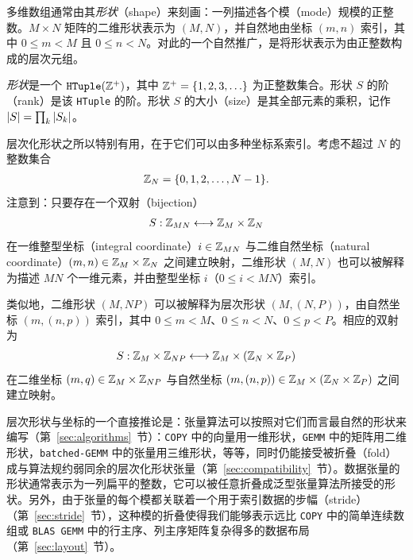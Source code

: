 \label{sec:shape}

多维数组通常由其\emph{形状}（shape）来刻画：一列描述各个模（mode）规模的正整数。$M{\times}N$ 矩阵的二维形状表示为 $(M,N)$，并自然地由坐标 $(m,n)$ 索引，其中 $0 \leq m < M$ 且 $0 \leq n < N$。对此的一个自然推广，是将形状表示为由正整数构成的层次元组。

\begin{definition}
\emph{形状}是一个 $\texttt{HTuple}(\mathbb{Z}^+)$，其中 $\mathbb{Z}^+ = \{1,2,3,\ldots\}$ 为正整数集合。形状 $S$ 的阶（rank）是该 \texttt{HTuple} 的阶。形状 $S$ 的大小（size）是其全部元素的乘积，记作 $\left| {S} \right| = \prod_k \left| {S_k} \right|$。
\end{definition}

层次化形状之所以特别有用，在于它们可以由多种坐标系索引。考虑不超过 $N$ 的整数集合
\begin{align*}
\mathbb{Z}_N = \{ 0, 1, 2, \ldots, N-1 \}.
\end{align*}
\CuTe 注意到：只要存在一个双射（bijection）
\begin{align*}
S : \mathbb{Z}_{MN} \longleftrightarrow \mathbb{Z}_M \times \mathbb{Z}_N
\end{align*}
在一维整型坐标（integral coordinate）$i \in \mathbb{Z}_{MN}$ 与二维自然坐标（natural coordinate）$(m,n) \in \mathbb{Z}_M \times \mathbb{Z}_N$ 之间建立映射，二维形状 $(M,N)$ 也可以被解释为描述 $MN$ 个一维元素，并由整型坐标 $i$（$0 \leq i < MN$）索引。

类似地，二维形状 $(M,NP)$ 可以被解释为层次形状 $(M,(N,P))$，由自然坐标 $(m,(n,p))$ 索引，其中 $0 \leq m < M$、$0 \leq n < N$、$0 \leq p < P$。相应的双射为
\begin{align*}
S : \mathbb{Z}_M \times \mathbb{Z}_{NP} \longleftrightarrow \mathbb{Z}_M \times (\mathbb{Z}_N \times \mathbb{Z}_P)
\end{align*}
在二维坐标 $(m,q) \in \mathbb{Z}_M \times \mathbb{Z}_{NP}$ 与自然坐标 $(m,(n,p)) \in \mathbb{Z}_M \times (\mathbb{Z}_N \times \mathbb{Z}_P)$ 之间建立映射。

层次形状与坐标的一个直接推论是：张量算法可以按照对它们而言最自然的形状来编写（第~\ref{sec:algorithms}~节）：{\tt COPY} 中的向量用一维形状，{\tt GEMM} 中的矩阵用二维形状，{\tt batched-GEMM} 中的张量用三维形状，等等，同时仍能接受被折叠（fold）成与算法规约弱同余的层次化形状张量（第~\ref{sec:compatibility}~节）。数据张量的形状通常表示为一列扁平的整数，它可以被任意折叠成泛型张量算法所接受的形状。另外，由于张量的每个模都关联着一个用于索引数据的步幅（stride）（第~\ref{sec:stride}~节），这种模的折叠使得我们能够表示远比 {\tt COPY} 中的简单连续数组或 {\tt BLAS GEMM} 中的行主序、列主序矩阵复杂得多的数据布局（第~\ref{sec:layout}~节）。

